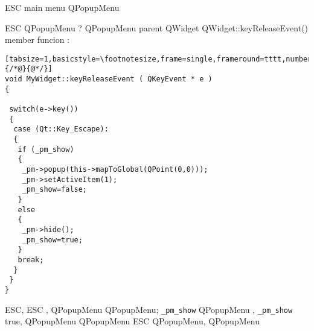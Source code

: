 \bigskip
ESC {\MbQ{}} main menu {\McQ{}}\zZ
{\MaQ{}} QPopupMenu {\MbQ{}}\zZ

{\McQ{}} ESC {\MaQ{}} QPopupMenu {\McQ{}}?
{\MdQ{}} QPopupMenu {\MbQ{}} parent QWidget {\MbQ{}} QWidget::keyReleaseEvent()
{\McQ{}} member funcion {\MdQ{}}:


\begin{lstlisting}[tabsize=1,basicstyle=\footnotesize,frame=single,frameround=tttt,numbers=left,breaklines=true,escapeinside={/*@}{@*/}]
void MyWidget::keyReleaseEvent ( QKeyEvent * e )
{
 
 switch(e->key())
 {
  case (Qt::Key_Escape):
  {
   if (_pm_show)
   {
    _pm->popup(this->mapToGlobal(QPoint(0,0)));
    _pm->setActiveItem(1);
    _pm_show=false;
   }
   else
   {
    _pm->hide();                                                                   
    _pm_show=true;                                                                 
   }
   break;
  }
 }
}
\end{lstlisting}

{\MaQ{}} ESC, {\McQ{}} ESC {\MaQ{}}, {\MbQ{}} QPopupMenu {\MbQ{}}
QPopupMenu; \verb+_pm_show+ {\McQ{}} QPopupMenu {\MbQ{}},
{\McQ{}} \verb+_pm_show+ {\MbQ{}} true, {\MaQ{}} QPopupMenu {\MaQ{}} QPopupMenu {\MjQ{}}\zZ
{\MaQ{}} ESC {\MaQ{}} QPopupMenu, {\MaQ{}} QPopupMenu{\MaQ{}}\zZ
